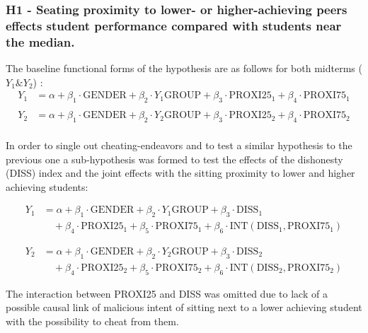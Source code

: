\documentclass[]{article}
\begin{document}
	
	\subsubsection{H1 - Seating proximity to lower- or higher-achieving peers effects student performance compared with students near the median.}
		
		The baseline functional forms of the hypothesis are as follows for both midterms ($Y_1 \& Y_2$) :
		$$
		\begin{aligned}
			Y_1 &= \alpha + \beta_1 \cdot \text{GENDER} + \beta_2 \cdot Y_1\text{GROUP} + \beta_3 \cdot \text{PROXI25}_1 + \beta_4 \cdot \text{PROXI75}_1 \\
		\end{aligned}
		$$
		$$
		\begin{aligned}
			Y_2 &= \alpha + \beta_1 \cdot \text{GENDER} + \beta_2 \cdot Y_2\text{GROUP} + \beta_3 \cdot \text{PROXI25}_2 + \beta_4 \cdot \text{PROXI75}_2 \\
		\end{aligned}
		$$
		
		
		In order to single out cheating-endeavors and to test a similar hypothesis to the previous one a sub-hypothesis was formed to test the effects of the dishonesty (DISS) index and the joint effects with the sitting proximity to lower and higher achieving students: 
		
		$$
		\begin{aligned}
			Y_1 &= \alpha + \beta_1 \cdot \text{GENDER} + \beta_2 \cdot Y_1\text{GROUP} + \beta_3 \cdot \text{DISS}_1    \\
			&\quad + \beta_4 \cdot \text{PROXI25}_1 + \beta_5 \cdot \text{PROXI75}_1  + \beta_6 \cdot \text{INT}(\text{DISS}_1,\text{PROXI75}_1)
		\end{aligned}
		$$
		
		$$
		\begin{aligned}
			Y_2 &= \alpha + \beta_1 \cdot \text{GENDER} + \beta_2 \cdot Y_2\text{GROUP} + \beta_3 \cdot \text{DISS}_2    \\
			&\quad + \beta_4 \cdot \text{PROXI25}_2 + \beta_5 \cdot \text{PROXI75}_2  + \beta_6 \cdot \text{INT}(\text{DISS}_2,\text{PROXI75}_2)
		\end{aligned}
		$$
		
		The interaction between PROXI25 and DISS was omitted due to lack of a possible causal link of malicious intent of sitting next to a lower achieving student with the possibility to cheat from them. \\
		
\end{document}
